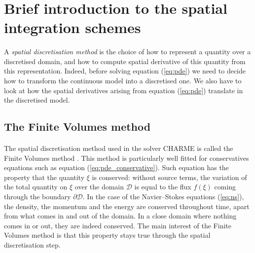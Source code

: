   \section{Brief introduction to the spatial integration schemes}

    \paragraph{}
    A \emph{spatial discretisation method} is the choice of how to represent a quantity over a discretised domain, and how to compute spatial derivative of this quantity from this representation.
    Indeed, before solving equation (\ref{eq:pde}) we need to decide how to transform the continuous model into a discretised one.
    We also have to look at how the spatial derivatives arising from equation (\ref{eq:pde}) translate in the discretised model.

    \subsection{The Finite Volumes method}

      \paragraph{}
      The spatial discretisation method used in the solver CHARME is called the Finite Volumes method \cite{EymardGallouetHerbin2000}.
      This method is particularly well fitted for conservatives equations such as equation (\ref{eq:pde_conservative}).
      Such equation has the property that the quantity $\xi$ is conserved: without source terms, the variation of the total quantity on $\xi$ over the domain $\mathcal{D}$ is equal to the flux $f\left(\xi\right)$ coming through the boundary $\partial\mathcal{D}$.
      In the case of the Navier--Stokes equations (\ref{eq:ns}), the density, the momentum and the energy are conserved throughout time, apart from what comes in and out of the domain.
      In a close domain where nothing comes in or out, they are indeed conserved.
      The main interest of the Finite Volumes method is that this property stays true through the spatial discretisation step.


